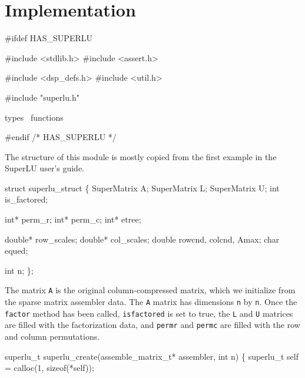 \section{Implementation}

\nwenddocs{}\endmoddef
#ifdef HAS_SUPERLU

#include <stdlib.h>
#include <assert.h>

#include <dsp_defs.h>
#include <util.h>

#include "superlu.h"

\LA{}types~{\nwtagstyle{}}\RA{}
\LA{}functions~{\nwtagstyle{}}\RA{}

#endif /* HAS_SUPERLU */
\nwendcode{}\nwdocspar

The structure of this module is mostly copied from the first example
in the SuperLU user's guide. %

\nwenddocs{}\endmoddef
struct superlu_struct \{
    SuperMatrix A;
    SuperMatrix L;
    SuperMatrix U;
    int  is_factored;

    int* perm_r;
    int* perm_c;
    int* etree;

    double* row_scales;
    double* col_scales;
    double rowcnd, colcnd, Amax;
    char equed;

    int  n;
\};

\nwendcode{}\nwdocspar

The matrix {\tt{}A} is the original column-compressed matrix, which
we initialize from the sparse matrix assembler data.  The {\tt{}A} matrix
has dimensions {\tt{}n} by {\tt{}n}.  Once the {\tt{}factor} method has been
called, {\tt{}is{}factored} is set to true, the {\tt{}L} and {\tt{}U} matrices
are filled with the factorization data, and {\tt{}perm{}r} and {\tt{}perm{}c}
are filled with the row and column permutations.

\nwenddocs{}\endmoddef
superlu_t superlu_create(assemble_matrix_t* assembler, int n)
\{
    superlu_t self = calloc(1, sizeof(*self));

